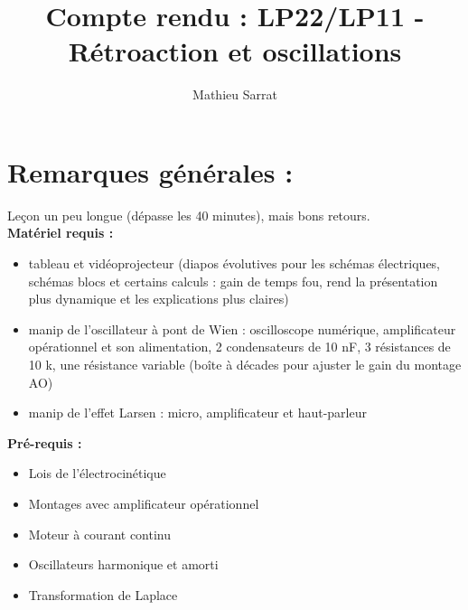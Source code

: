 \documentclass[11pt,a4paper]{report}
\author{Mathieu Sarrat}
\title{Compte rendu : LP22/LP11 - Rétroaction et oscillations}
\begin{document}
\maketitle

\section*{Remarques générales :}

Leçon un peu longue (dépasse les 40 minutes), mais bons retours.\\

\textbf{Matériel requis :}
\begin{itemize}
	\item tableau et vidéoprojecteur (diapos évolutives pour les schémas électriques, schémas blocs et certains calculs : gain de temps fou, rend la présentation plus dynamique et les explications plus claires)
	\item manip de l'oscillateur à pont de Wien : oscilloscope numérique, amplificateur opérationnel et son alimentation, 2 condensateurs de 10 nF, 3 résistances de 10 k, une résistance variable (boîte à décades pour ajuster le gain du montage AO)
	\item manip de l'effet Larsen : micro, amplificateur et haut-parleur\\
\end{itemize}

\textbf{Pré-requis :}
\begin{itemize}
	\item Lois de l'électrocinétique
	\item Montages avec amplificateur opérationnel
	\item Moteur à courant continu
	\item Oscillateurs harmonique et amorti
	\item Transformation de Laplace\\
\end{itemize}
\end{document}
